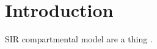 \documentclass[12pt]{article}
\begin{document}
\section*{Introduction}

SIR compartmental model are a thing \cite{McKendrick1927,Anderson1991}. 


 
\end{document}

